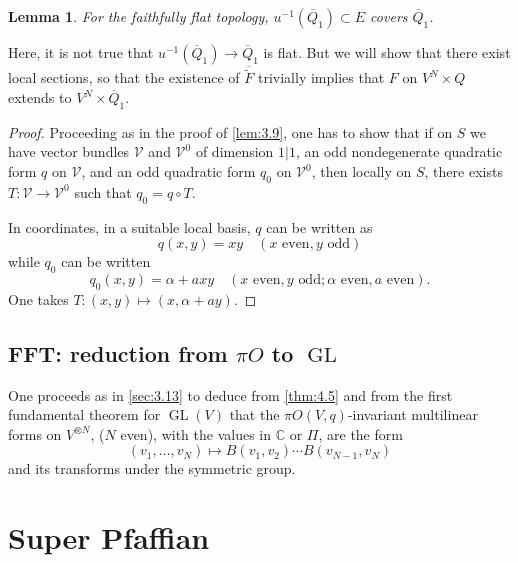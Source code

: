\documentclass[11pt,a4paper]{article}
\theoremstyle{plain}
\newtheorem{lemma}[theorem]{Lemma}
\theoremstyle{definition}
\DeclareMathOperator{\GL}{GL}
\newcommand{\C}{\mathbb{C}}
\begin{document}
\begin{lemma}\label{lem:4.8}
For the faithfully flat topology, $u^{-1}(\overline{Q}_1) \subset E$ covers $\overline{Q}_1$.
\end{lemma}

Here, it is not true that $u^{-1}(\overline{Q}_1) \to \overline{Q}_1$ is flat. But we will show that there exist local sections, so that the existence of $\overline{\widetilde{F}}$ trivially implies that $F$ on $V^N \times Q$ extends to $V^N \times \overline{Q}_1$.

\begin{proof}
Proceeding as in the proof of \ref{lem:3.9}, one has to show that if on $S$ we have vector bundles $\mathcal{V}$ and $\mathcal{V}^0$ of dimension $1|1$, an odd nondegenerate quadratic form $q$ on $\mathcal{V}$, and an odd quadratic form $q_0$ on $\mathcal{V}^0$, then locally on $S$, there exists $T : \mathcal{V} \to \mathcal{V}^0$ such that $q_0 = q \circ T$.

In coordinates, in a suitable local basis, $q$ can be written as
\[
q(x,y) = xy \quad (x \text{ even}, y \text{ odd})
\]
while $q_0$ can be written
\[
q_0(x,y) = \alpha + axy \quad (x \text{ even}, y \text{ odd}; \alpha \text{ even}, a \text{ even}).
\]
One takes $T : (x,y) \mapsto (x, \alpha + ay)$.
\end{proof}

\subsection{FFT: reduction from $\pi O$ to $\GL$}
One proceeds as in \ref{sec:3.13} to deduce from \ref{thm:4.5} and from the first fundamental theorem for $\GL(V)$ that the $\pi O(V,q)$-invariant multilinear forms on $V^{\otimes N}$, ($N$ even), with the values in $\C$ or $\Pi$, are the form
\[
(v_1,\dots,v_N) \mapsto B(v_1, v_2) \cdots B(v_{N-1}, v_N)
\]
and its transforms under the symmetric group.

\section{Super Pfaffian}
\end{document}
